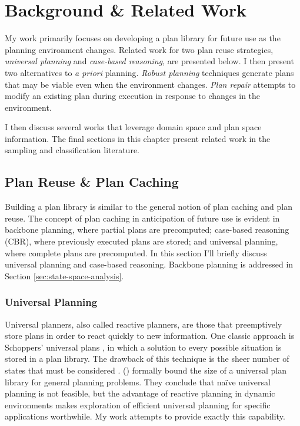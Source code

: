 \chapter{Background \& Related Work}
\thispagestyle{plain}

\label{ch:background}

My work primarily focuses on developing a plan library for future use as the planning environment changes.  Related work for two plan reuse strategies, \textit{universal planning} and \textit{case-based reasoning}, are presented below.  I then present two alternatives to \textit{a priori} planning.  \textit{Robust planning} techniques generate plans that may be viable even when the environment changes.  \textit{Plan repair} attempts to modify an existing plan during execution in response to changes in the environment.

I then discuss several works that leverage domain space and plan space information.  The final sections in this chapter present related work in the sampling and classification literature.

\section{Plan Reuse \& Plan Caching}

Building a plan library is similar to the general notion of plan caching and plan reuse.  The concept of plan caching in anticipation of future use is evident in backbone planning, where partial plans are precomputed; case-based reasoning (CBR), where previously executed plans are stored; and universal planning, where complete plans are precomputed.  In this section I'll briefly discuss universal planning and case-based reasoning.  Backbone planning is addressed in Section \ref{sec:state-space-analysis}.



\subsection{Universal Planning}

Universal planners, also called reactive planners, are those that preemptively store plans in order to react quickly to new information.  One classic approach is Schoppers' universal plans \citep{schoppers87universal,schoppers89defense,schoppers94estimating,chapman89penguins}, in which a solution to every possible situation is stored in a plan library.  The drawback of this technique is the sheer number of states that must be considered \citep{ginsberg89universal,ginsberg89ginsberg,jonsson96size}.  \citeauthor{jonsson96size} (\citeyear{jonsson96size}) formally bound the size of a universal plan library for general planning problems.  They conclude that na\"{i}ve universal planning is not feasible, but the advantage of reactive planning in dynamic environments makes exploration of efficient universal planning for specific applications worthwhile.  My work attempts to provide exactly this capability.


